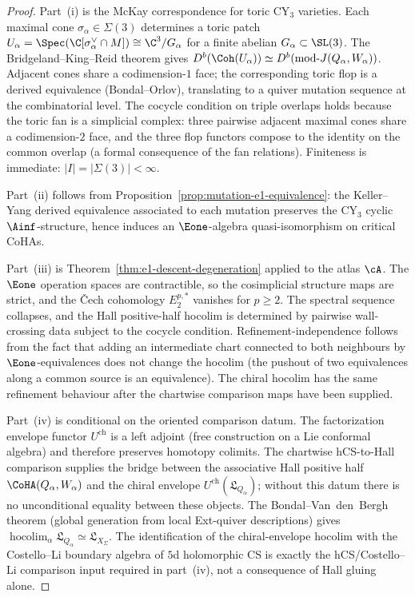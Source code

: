 \begin{proof}
Part~(i) is the McKay correspondence for toric CY$_3$ varieties. Each maximal cone $\sigma_\alpha \in \Sigma(3)$ determines a toric patch $U_\alpha = \Spec(\C[\sigma_\alpha^\vee \cap M]) \cong \C^3/G_\alpha$ for a finite abelian $G_\alpha \subset \SL(3)$. The Bridgeland--King--Reid theorem gives $D^b(\Coh(U_\alpha)) \simeq D^b(\mathrm{mod}\text{-}J(Q_\alpha, W_\alpha))$. Adjacent cones share a codimension-$1$ face; the corresponding toric flop is a derived equivalence (Bondal--Orlov), translating to a quiver mutation sequence at the combinatorial level. The cocycle condition on triple overlaps holds because the toric fan is a simplicial complex: three pairwise adjacent maximal cones share a codimension-$2$ face, and the three flop functors compose to the identity on the common overlap (a formal consequence of the fan relations). Finiteness is immediate: $|I| = |\Sigma(3)| < \infty$.

Part~(ii) follows from Proposition~\ref{prop:mutation-e1-equivalence}: the Keller--Yang derived equivalence associated to each mutation preserves the CY$_3$ cyclic $\Ainf$-structure, hence induces an $\Eone$-algebra quasi-isomorphism on critical CoHAs.

Part~(iii) is Theorem~\ref{thm:e1-descent-degeneration} applied to the atlas $\cA$. The $\Eone$ operation spaces are contractible, so the cosimplicial structure maps are strict, and the \v{C}ech cohomology $E_2^{p,*}$ vanishes for $p \geq 2$. The spectral sequence collapses, and the Hall positive-half hocolim is determined by pairwise wall-crossing data subject to the cocycle condition. Refinement-independence follows from the fact that adding an intermediate chart connected to both neighbours by $\Eone$-equivalences does not change the hocolim (the pushout of two equivalences along a common source is an equivalence). The chiral hocolim has the same refinement behaviour after the chartwise comparison maps have been supplied.

Part~(iv) is conditional on the oriented comparison datum. The factorization envelope functor $U^{\mathrm{ch}}$ is a left adjoint (free construction on a Lie conformal algebra) and therefore preserves homotopy colimits. The chartwise hCS-to-Hall comparison supplies the bridge between the associative Hall positive half $\CoHA(Q_\alpha, W_\alpha)$ and the chiral envelope $U^{\mathrm{ch}}(\mathfrak{L}_{Q_\alpha})$; without this datum there is no unconditional equality between these objects. The Bondal--Van~den~Bergh theorem (global generation from local Ext-quiver descriptions) gives $\operatorname{hocolim}_\alpha \mathfrak{L}_{Q_\alpha} \simeq \mathfrak{L}_{X_\Sigma}$. The identification of the chiral-envelope hocolim with the Costello--Li boundary algebra of $5$d holomorphic CS is exactly the hCS/Costello--Li comparison input required in part~(iv), not a consequence of Hall gluing alone.


\end{proof}
